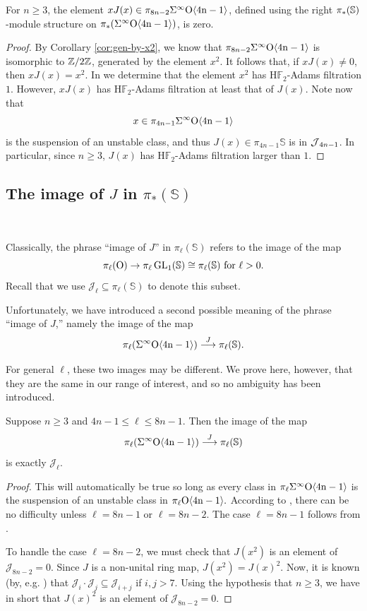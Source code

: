 \begin{lem} \label{lem:xJ(x)null}
For $n \ge 3$, the element $xJ(x) \in \pi_{8n-2} \Sigma^{\infty} \mathrm{O \langle 4n-1\rangle}$, defined using the right $\pi_*(\operatorname{\mathbb{S}})$-module structure on $\pi_*(\Sigma^{\infty} \mathrm{O \langle 4n-1\rangle})$, is zero.
\end{lem}

\begin{proof}
By Corollary \ref{cor:gen-by-x2}, we know that $\pi_{8n-2} \Sigma^{\infty} \mathrm{O \langle 4n-1\rangle}$ is isomorphic to $\mathbb{Z}/2\mathbb{Z}$, generated by the element $x^2$.
It follows that, if $xJ(x) \ne 0$, then $xJ(x) =x^2$.
In  we determine that the element $x^2$ has $\mathrm{H}\mathbb{F}_2$-Adams filtration $1$.
However, $xJ(x)$ has $\mathrm{H}\mathbb{F}_2$-Adams filtration at least that of $J(x)$.
Note now that $$x \in \pi_{4n-1} \Sigma^{\infty} \mathrm{O \langle 4n-1\rangle}$$ is the suspension of an unstable class, and thus $J(x) \in \pi_{4n-1} \mathbb{S}$ is in $\operatorname{\mathcal{J}}_{4n-1}$.
In particular, since $n\ge 3$, $J(x)$ has $\mathrm{H}\mathbb{F}_2$-Adams filtration larger than $1$.
\end{proof}

\subsection{The image of $J$ in $\pi_*(\mathbb{S})$}\ 

Classically, the phrase ``image of $J$'' in $\pi_{\ell}(\mathbb{S})$ refers to the image of the map
$$\pi_\ell(\mathrm{O}) \to \pi_{\ell}\operatorname{\mathrm{GL}}_1(\mathbb{S}) \cong \pi_{\ell}(\mathbb{S}) \text{ for } \ell>0.$$
Recall that we use $\mathcal{J}_{\ell} \subseteq \pi_{\ell}(\mathbb{S})$ to denote this subset.

Unfortunately, we have introduced a second possible meaning of the phrase ``image of $J$,'' namely the image of the map
$$\pi_{\ell}(\Sigma^{\infty} \mathrm{O \langle 4n-1\rangle}) \stackrel{J}{\longrightarrow} \pi_{\ell}(\mathbb{S}).$$

For general $\ell$, these two images may be different.  We prove here, however, that they are the same in our range of interest, and so no ambiguity has been introduced.
\begin{thm} \label{thm:imJwelldefined}
Suppose $n \ge 3$ and $4n-1 \le \ell \le 8n-1$.  Then the image of the map
$$\pi_{\ell}(\Sigma^{\infty} \mathrm{O \langle 4n-1\rangle}) \stackrel{J}{\longrightarrow} \pi_{\ell}(\mathbb{S})$$
is exactly $\mathcal{J}_{\ell}$.
\end{thm}

\begin{proof}
This will automatically be true so long as every class in 
$\pi_{\ell} \Sigma^{\infty} \mathrm{O \langle 4n-1\rangle}$ is the suspension of an unstable class in $\pi_{\ell} \mathrm{O \langle 4n-1\rangle}.$
According to , there can be no difficulty unless $\ell=8n-1$ or $\ell=8n-2$.
The case $\ell=8n-1$ follows from .

To handle the case $\ell=8n-2$, we must check that $J(x^2)$ is an element of $\mathcal{J}_{8n-2}=0$.
Since $J$ is a non-unital ring map, $J(x^2)=J(x)^2$.  Now, it is known (by, e.g. \cite[Lemma 3]{Novikov}) that $\mathcal{J}_i \cdot \mathcal{J}_j \subseteq \mathcal{J}_{i+j}$ if $i,j>7$.  Using the hypothesis that $n \ge 3$, we have in short that $J(x)^2$ is an element of $\mathcal{J}_{8n-2} = 0$.
\end{proof}

